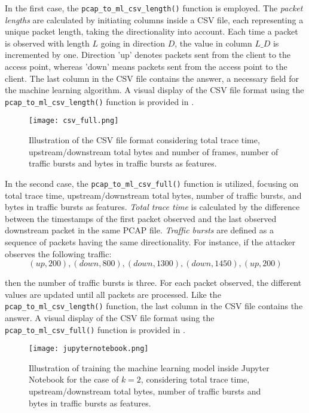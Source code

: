 In the first case, the \texttt{pcap\_to\_ml\_csv\_length()} function is employed. The \textit{packet lengths} are calculated by initiating columns inside a CSV file, each representing a unique packet length, taking the directionality into account. Each time a packet is observed with length $L$ going in direction $D$, the value in column $L\_D$ is incremented by one. Direction 'up' denotes packets sent from the client to the access point, whereas 'down' means packets sent from the access point to the client. The last column in the CSV file contains the answer, a necessary field for the machine learning algorithm. A visual display of the CSV file format using the \texttt{pcap\_to\_ml\_csv\_length()} function is provided in .

\begin{figure}
	\centering
        \texttt{[image: csv\_full.png]}
        \caption{Illustration of the CSV file format considering total trace time, upstream/downstream total bytes and number of frames, number of traffic bursts and bytes in traffic bursts as features.}
    \label{fig:csvfull}
\end{figure}

In the second case, the \texttt{pcap\_to\_ml\_csv\_full()} function is utilized, focusing on total trace time, upstream/downstream total bytes, number of traffic bursts, and bytes in traffic bursts as features. \textit{Total trace time} is calculated by the difference between the timestamps of the first packet observed and the last observed downstream packet in the same PCAP file. \textit{Traffic bursts} are defined as a sequence of packets having the same directionality. For instance, if the attacker observes the following traffic: 
\begin{equation*}
(up, 200), (down, 800), (down, 1300), (down, 1450), (up, 200)
\end{equation*}

then the number of traffic bursts is three. For each packet observed, the different values are updated until all packets are processed. Like the \texttt{pcap\_to\_ml\_csv\_length()} function, the last column in the CSV file contains the answer.  A visual display of the CSV file format using the \texttt{pcap\_to\_ml\_csv\_full()} function is provided in  .

\begin{figure}
	\centering
        \texttt{[image: jupyternotebook.png]}
        \caption{Illustration of training the machine learning model inside Jupyter Notebook for the case of $k=2$, considering total trace time, upstream/downstream total bytes, number of traffic bursts and bytes in traffic bursts as features.}
    \label{fig:jupyternotebook}
\end{figure}

